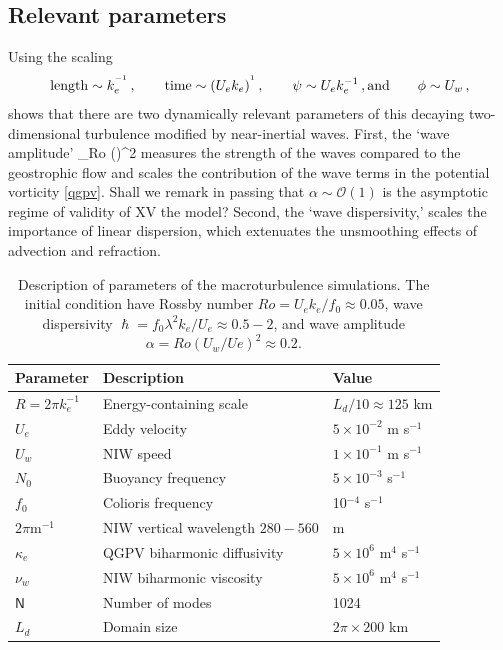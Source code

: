 \documentclass{jfm}
\newcommand{\NIW}{near-inertial wave}
\begin{document}
 \subsection{Relevant parameters}
Using the scaling
 \begin{align}\label{scaling}
    \text{length}    \sim  k_e^{^{-1}}\, ,\qquad
    \text{time}    \sim (U_e k_e)^{^1}\, ,\qquad
    \psi \sim U_e k_e^{-1} \, ,
    \text{and}\qquad\phi \sim U_w\, ,
 \end{align}
 shows that there are two dynamically relevant parameters of this decaying
 two-dimensional turbulence modified by \NIW s. First, the `wave amplitude'
 \beq
 \label{alpha}
 \alpha {} {}_{ Ro} \times
 {\left(\right)^2}\com
 \eeq
 measures the strength of the waves compared to the geostrophic flow and scales
 the contribution of the wave terms in the potential vorticity \eqref{qgpv}.
 \textcolor{cesar}{Shall we remark in passing that $\alpha\sim\mathcal{O}(1)$ is the asymptotic
 regime of validity of XV the model?}
 Second, the `wave dispersivity,'
 \beq
 \label{hslash}
 \hslash {} \disp \times {}\com
 \eeq
 scales the importance of linear dispersion, which extenuates the unsmoothing
 effects of advection and refraction.

 \begin{table}
  \begin{center}
    \caption{Description of parameters of the macroturbulence simulations.
             The initial condition have Rossby number $Ro = U_e k_e/f_0 \approx
             0.05$, wave dispersivity $\hslash = f_0\lambda^2k_e/U_e
             \approx 0.5-2$, and wave amplitude $\alpha = Ro (U_w/Ue)^2 \approx 0.2$.}
    \label{parameters_turb}
    \begin{tabular}{ l | l | l }
      \hline
       Parameter & Description & Value \\
       \hline
       $R= 2\pi k_e^{-1}$ & Energy-containing scale & $L_d/10 \approx 125$ km \\
       $U_e$ & Eddy velocity & $5\times 10^{-2}$ m s$^{-1}$ \\
       $U_w$ & NIW speed & $1 \times 10^{-1}$ m s$^{-1}$ \\
       $N_0$ & Buoyancy frequency & $5 \times 10^{-3}$ s$^{-1}$\\
       $f_0$ & Colioris frequency & 10$^{-4}$ s$^{-1}$\\
       $2\pi$m$^{-1}$ & NIW vertical wavelength $280-560$ & m \\
       $\kappa_e$ & QGPV biharmonic diffusivity & $5\times 10^{6}$ m$^4$ s$^{-1}$\\
       $\nu_w$ & NIW biharmonic viscosity & $ 5 \times 10^{6}$ m$^4$ s$^{-1}$\\
       $\mathsf{N}$   & Number of modes &  1024  \\
       $L_d$ & Domain size & $2\pi\times 200$ km \\
    \end{tabular}
  \end{center}
 \end{table}
\end{document}
